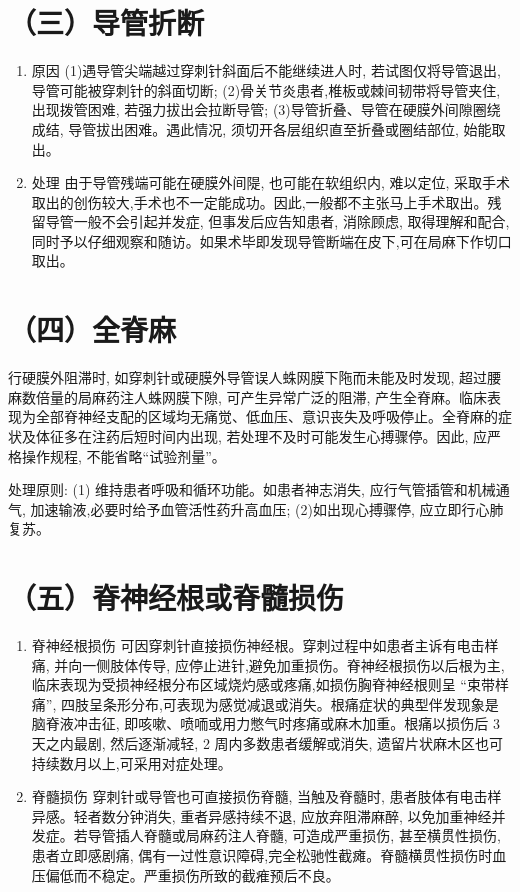 \documentclass[10pt]{article}
\begin{document}
\section*{（三）导管折断}
\begin{enumerate}
  \item 原因 (1)遇导管尖端越过穿刺针斜面后不能继续进人时, 若试图仅将导管退出,导管可能被穿刺针的斜面切断; (2)骨关节炎患者,椎板或棘间韧带将导管夹住,出现拨管困难, 若强力拔出会拉断导管; (3)导管折叠、导管在硬膜外间隙圈绕成结, 导管拔出困难。遇此情况, 须切开各层组织直至折叠或圈结部位, 始能取出。

  \item 处理 由于导管残端可能在硬膜外间隄, 也可能在软组织内, 难以定位, 采取手术取出的创伤较大,手术也不一定能成功。因此,一般都不主张马上手术取出。残留导管一般不会引起并发症, 但事发后应告知患者, 消除顾虑, 取得理解和配合, 同时予以仔细观察和随访。如果术毕即发现导管断端在皮下,可在局麻下作切口取出。

\end{enumerate}

\section*{（四）全脊麻}
行硬膜外阻滞时, 如穿刺针或硬膜外导管误人蛛网膜下陁而未能及时发现, 超过腰麻数倍量的局麻药注人蛛网膜下隙, 可产生异常广泛的阻滞, 产生全脊麻。临床表现为全部脊神经支配的区域均无痛觉、低血压、意识丧失及呼吸停止。全脊麻的症状及体征多在注药后短时间内出现, 若处理不及时可能发生心搏骤停。因此, 应严格操作规程, 不能省略“试验剂量”。

处理原则: (1) 维持患者呼吸和循环功能。如患者神志消失, 应行气管插管和机械通气, 加速输液,必要时给予血管活性药升高血压; (2)如出现心搏骤停, 应立即行心肺复苏。

\section*{（五）脊神经根或脊髓损伤}
\begin{enumerate}
  \item 脊神经根损伤 可因穿刺针直接损伤神经根。穿刺过程中如患者主诉有电击样痛, 并向一侧肢体传导, 应停止进针,避免加重损伤。脊神经根损伤以后根为主,临床表现为受损神经根分布区域烧灼感或疼痛,如损伤胸脊神经根则呈 “束带样痛”, 四肢呈条形分布,可表现为感觉减退或消失。根痛症状的典型伴发现象是脑脊液冲击征, 即咳嗽、喷㖇或用力憋气时疼痛或麻木加重。根痛以损伤后 3 天之内最剧, 然后逐渐减轻, 2 周内多数患者缓解或消失, 遗留片状麻木区也可持续数月以上,可采用对症处理。

  \item 脊髓损伤 穿刺针或导管也可直接损伤脊髓, 当触及脊髓时, 患者肢体有电击样异感。轻者数分钟消失, 重者异感持续不退, 应放弃阻滞麻醉, 以免加重神经并发症。若导管插人脊髓或局麻药注人脊髓, 可造成严重损伤, 甚至横贯性损伤, 患者立即感剧痛, 偶有一过性意识障碍,完全松驰性截瘫。脊髓横贯性损伤时血压偏低而不稳定。严重损伤所致的截痽预后不良。

\end{enumerate}
\end{document}
